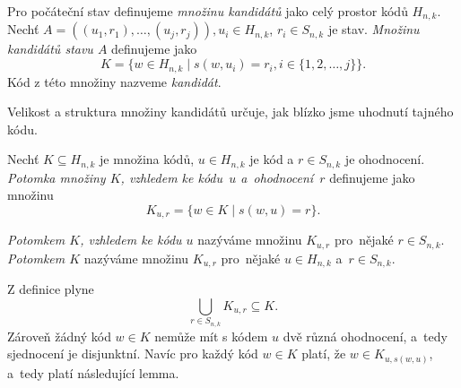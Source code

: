 \begin{definice}\label{kandidat}
  Pro počáteční stav definujeme \emph{množinu kandidátů} jako celý prostor kódů $H_{n,k}$. Nechť $A = \left((u_1, r_1), \dots, (u_j,r_j)\right), u_i \in H_{n,k}$, $ r_i \in S_{n,k}$ je stav. \emph{Množinu kandidátů stavu $A$} definujeme jako
  \[K = \{w \in H_{n,k} \mid s(w,u_i) = r_i,  i \in \{1,2,\dots ,j\} \}.\]
  Kód z této množiny nazveme \emph{kandidát}. 
  

\end{definice}
Velikost a struktura množiny kandidátů určuje, jak blízko jsme uhodnutí tajného kódu.
\begin{definice}\label{defpotomekmnoziny}
  Nechť $K \subseteq H_{n,k}$ je množina kódů, $u \in H_{n,k}$ je kód a $r \in S_{n,k}$ je ohodnocení. \emph{Potomka množiny $K$, vzhledem ke kódu~$u$ a~ohodnocení~$r$} definujeme jako množinu 
  \[K_{u,r} = \{w \in K \mid s(w,u) = r\}.\] 
\end{definice}
\begin{pozn}
    \emph{Potomkem $K$, vzhledem ke kódu $u$} nazýváme množinu $K_{u,r}$ pro~nějaké $r \in S_{n,k}$. \emph{Potomkem $K$} nazýváme množinu $K_{u,r}$ pro~nějaké $u\in H_{n,k}$ a~$r \in S_{n,k}$. 
\end{pozn}
Z definice plyne
\[\bigcup_{r\in S_{n,k}} K_{u,r} \subseteq K.\] Zároveň žádný kód $w \in K$ nemůže mít s kódem $u$ dvě různá ohodnocení, a~tedy sjednocení je disjunktní. Navíc pro každý kód $w \in K$ platí, že $w \in K_{u, s(w,u)}$, a~tedy platí následující lemma.


